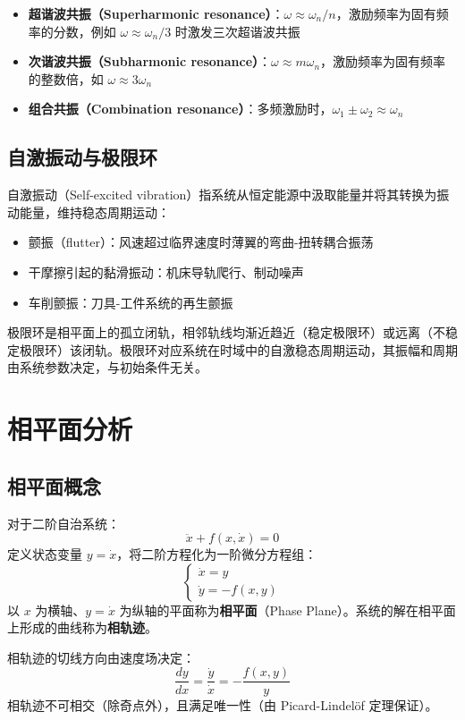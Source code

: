 \begin{itemize}
    \item \textbf{超谐波共振（Superharmonic resonance）}：$\omega \approx \omega_n / n$，激励频率为固有频率的分数，例如 $\omega \approx \omega_n/3$ 时激发三次超谐波共振
    \item \textbf{次谐波共振（Subharmonic resonance）}：$\omega \approx m \omega_n$，激励频率为固有频率的整数倍，如 $\omega \approx 3\omega_n$
    \item \textbf{组合共振（Combination resonance）}：多频激励时，$\omega_1 \pm \omega_2 \approx \omega_n$
\end{itemize}

\subsection{自激振动与极限环}
自激振动（Self-excited vibration）指系统从恒定能源中汲取能量并将其转换为振动能量，维持稳态周期运动：
\begin{itemize}
    \item 颤振（flutter）：风速超过临界速度时薄翼的弯曲-扭转耦合振荡
    \item 干摩擦引起的黏滑振动：机床导轨爬行、制动噪声
    \item 车削颤振：刀具-工件系统的再生颤振
\end{itemize}

\begin{definition}[极限环]
极限环是相平面上的孤立闭轨，相邻轨线均渐近趋近（稳定极限环）或远离（不稳定极限环）该闭轨。极限环对应系统在时域中的自激稳态周期运动，其振幅和周期由系统参数决定，与初始条件无关。
\end{definition}

\section{相平面分析}
\subsection{相平面概念}
对于二阶自治系统：
\[
\ddot{x} + f(x, \dot{x}) = 0
\]
定义状态变量 $y = \dot{x}$，将二阶方程化为一阶微分方程组：
\[
\begin{cases}
\dot{x} = y \\
\dot{y} = -f(x, y)
\end{cases}
\]
以 $x$ 为横轴、$y = \dot{x}$ 为纵轴的平面称为\textbf{相平面}（Phase Plane）。系统的解在相平面上形成的曲线称为\textbf{相轨迹}。

\begin{myformula}
相轨迹的切线方向由速度场决定：
\[
\frac{dy}{dx} = \frac{\dot{y}}{\dot{x}} = -\frac{f(x,y)}{y}
\]
相轨迹不可相交（除奇点外），且满足唯一性（由 Picard-Lindel\"of 定理保证）。
\end{myformula}

